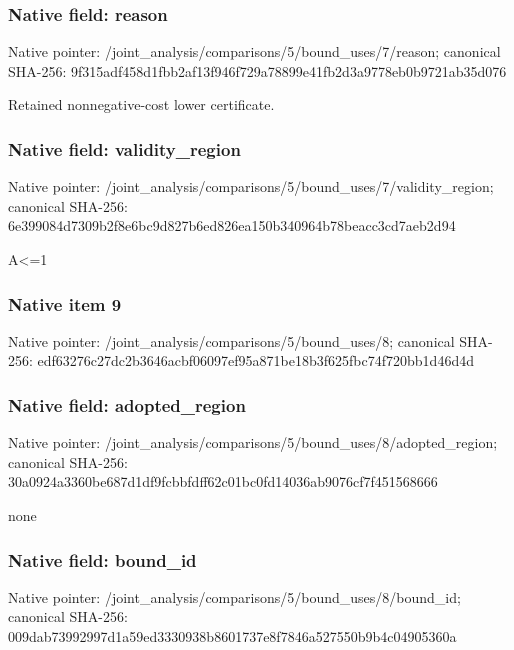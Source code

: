 \documentclass[10pt,a4paper]{article}
\begin{document}
\subsubsection{Native field: reason}
Native pointer: /joint\_\allowbreak{}analysis/comparisons/5/bound\_\allowbreak{}uses/7/reason; canonical SHA-256: 9f315adf458d1fbb2af13f946f729a78899e41fb2d3a9778eb0b9721ab35d076

\begingroup\raggedright\sloppy Retained nonnegative-cost lower certificate.\par\endgroup

\subsubsection{Native field: validity\_\allowbreak{}region}
Native pointer: /joint\_\allowbreak{}analysis/comparisons/5/bound\_\allowbreak{}uses/7/validity\_\allowbreak{}region; canonical SHA-256: 6e399084d7309b2f8e6bc9d827b6ed826ea150b340964b78beacc3cd7aeb2d94

\begingroup\raggedright\sloppy A<=\allowbreak{}1\par\endgroup

\subsubsection{Native item 9}
Native pointer: /joint\_\allowbreak{}analysis/comparisons/5/bound\_\allowbreak{}uses/8; canonical SHA-256: edf63276c27dc2b3646acbf06097ef95a871be18b3f625fbc74f720bb1d46d4d

\subsubsection{Native field: adopted\_\allowbreak{}region}
Native pointer: /joint\_\allowbreak{}analysis/comparisons/5/bound\_\allowbreak{}uses/8/adopted\_\allowbreak{}region; canonical SHA-256: 30a0924a3360be687d1df9fcbbfdff62c01bc0fd14036ab9076cf7f451568666

\begingroup\raggedright\sloppy none\par\endgroup

\subsubsection{Native field: bound\_\allowbreak{}id}
Native pointer: /joint\_\allowbreak{}analysis/comparisons/5/bound\_\allowbreak{}uses/8/bound\_\allowbreak{}id; canonical SHA-256: 009dab73992997d1a59ed3330938b8601737e8f7846a527550b9b4c04905360a
\end{document}
